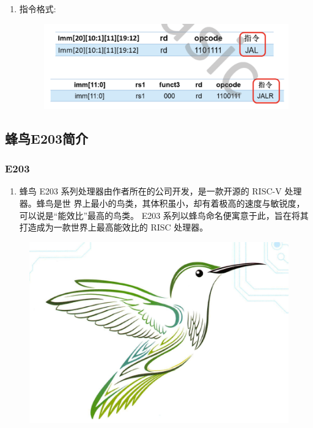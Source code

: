 \documentclass[a4paper, 14pt, oneside]{book} %
\numberwithin{equation}{subsection}
\begin{document}
\begin{enumerate}
\begin{enumerate}
						\item{指令格式:}
							\begin{figure}[!htbp]
								\centering
								\includegraphics[scale=0.5]{img/j3.png}
							\end{figure}
					\end{enumerate}
			\end{enumerate}

		\subsection{蜂鸟E203简介}
			\subsubsection{E203}
				\begin{enumerate}
					\item 
						蜂鸟 E203 系列处理器由作者所在的公司开发，是一款开源的 RISC-V 处理器。蜂鸟是世
						界上最小的鸟类，其体积虽小，却有着极高的速度与敏锐度，可以说是“能效比”最高的鸟类。
						E203 系列以蜂鸟命名便寓意于此，旨在将其打造成为一款世界上最高能效比的 RISC 处理器。
				\end{enumerate}	
				\begin{figure}[!htbp]
					\centering
					\includegraphics[scale=0.8]{img/four.png}
				\end{figure}
					
\end{document}
